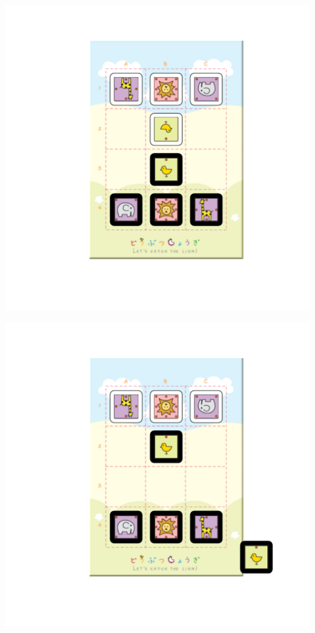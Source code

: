 \documentclass{beamer}
\begin{document}
\begin{frame}
\includegraphics[scale = 0.6, clip=true, trim=1in 1in 0in 0.5in]{example0.pdf}
\end{frame}
\begin{frame}
\includegraphics[scale = 0.6, clip=true, trim=1in 1in 0in 0.5in]{example1.pdf}
\end{frame}
\end{document}
